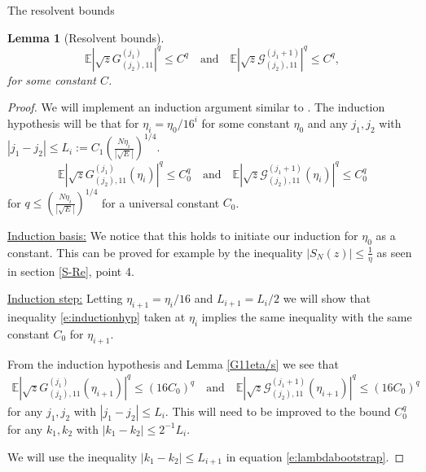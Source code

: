 \documentclass[11pt, a4paper, oneside]{book}
\numberwithin{equation}{chapter}
\newcommand{\E}{\mathbb E}
\newtheorem{lem}[thm]{Lemma}
\begin{document}
\begin{section}{The resolvent bounds}
\begin{lem}[Resolvent bounds]
%
\[
\E|\sqrt z G^{(j_1)}_{(j_2), 11}|^{q} \leq C^{q} \quad \text{and} \quad \E|\sqrt z \mathcal{G}^{(j_1+1)}_{(j_2), 11}|^{q} \leq C^{q},
\]
for some constant $C$.
\end{lem}
%
\begin{proof}
We will implement an induction argument similar to \cite{cacciapuoti2015bounds, gotze2016optimal}.  The induction hypothesis will be that for $\eta_i = \eta_0/16^i$ for some constant $\eta_0$ and any $j_1,j_2 $ with $|j_1-j_2| \leq L_i := C_1 \left (\frac{N \eta_i}{|\sqrt{E}|} \right )^{1/4}.$
%
\begin{equation}\label{e:inductionhyp}
\E|\sqrt{z} G^{(j_1)}_{(j_2), 11}(\eta_i)|^q \leq C_0^{q} \quad \text{and} \quad \E|\sqrt{z} \mathcal{G}^{(j_1+1)}_{(j_2), 11}(\eta_i)|^q \leq C_0^{q}
\end{equation}
%
for $q \leq \left (\frac{N \eta_i}{|\sqrt{E}|} \right )^{1/4}$ for a universal constant $C_0$. 

\underline{Induction basis:} We notice that this holds to initiate our induction for $\eta_0$ as a constant. This can be proved for example by the inequality $|S_N(z)| \leq \frac{1}{\eta}$ as seen in section \ref{S-Re}, point 4.

\underline{Induction step:} Letting $\eta_{i+1} = \eta_i/16$ and $L_{i+1} =  L_i/2 $ we will show that inequality \eqref{e:inductionhyp} taken at $\eta_i$ implies the same inequality with the same constant $C_0$ for $\eta_{i+1}$. 

From the induction hypothesis and Lemma \ref{G11eta/s} we see that
%
\begin{equation}
\begin{split}\label{e:s}
\E|\sqrt z G^{(j_1)}_{(j_2), 11}(\eta_{i+1})|^{q} \leq (16C_0)^{q} \quad \text{and} \quad \E| \sqrt{z}\mathcal{G}^{(j_1+1)}_{(j_2), 11}(\eta_{i+1})|^{q} \leq (16C_0)^{q}
\end{split}
\end{equation}
%
for any $j_1, j_2$ with $| j_1 - j_2 | \leq L_i$. This will need to be improved to the bound $C_0^q$ for any $k_1, k_2$ with $|k_1-k_2| \leq 2^{-1} L_i$.

We will use the inequality $|k_1 - k_2| \leq L_{i+1}$ in equation \eqref{e:lambdabootstrap}.


\end{proof}
\end{section}
\end{document}

